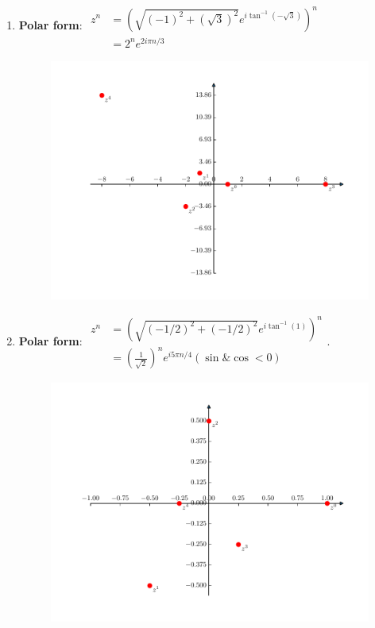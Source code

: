 \begin{homeworkProblem}
\begin{multicols}{2}
\begin{enumerate}
    \item \textbf{Polar form}:
    $\begin{aligned}
        z^n &= (\sqrt{(-1)^2 + (\sqrt{3})^2} e^{i\tan^{-1}(-\sqrt{3})})^n\\
        &= 2^n e^{2i\pi n/3}
    \end{aligned}$
    \begin{figure}[H]
        \centering
        \includegraphics[scale=0.5]{fig/fig8(d).pdf}
    \end{figure}
    \item \textbf{Polar form}:
    $\begin{aligned}
        z^n &= (\sqrt{(-1/2)^2+(-1/2)^2} e^{i\tan^{-1}(1)})^n\\
        &=(\frac{1}{\sqrt{2}})^n e^{i5\pi n/4} (\sin \& \cos < 0)
    \end{aligned}$.
    \begin{figure}[H]
        \centering
        \includegraphics[scale=0.5]{fig/fig8(e).pdf}
    \end{figure}
    
    \end{enumerate}
    \end{multicols}
    \end{homeworkProblem}